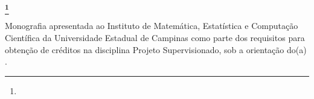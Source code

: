 %
%
\clearpage
{
\thispagestyle{empty}
\sffamily
\begin{center}

\vspace*{3cm}

{\large \aluno}

\vspace{5cm}

{
  \bfseries\Large
      {\titulo}\ifx\bolsa\undefined\else\footnote{\bolsa}\fi
}
\end{center}

\vspace{3.5cm}

\begin{flushright}
  \begin{minipage}{9cm}
  Monografia apresentada ao Instituto de Matemática, Estatística e
  Computação Científica da Universidade Estadual de Campinas como
  parte dos requisitos para obtenção de créditos na disciplina Projeto
  Supervisionado, sob a orientação do(a) {\orientador}.
  \end{minipage}
\end{flushright}

}
